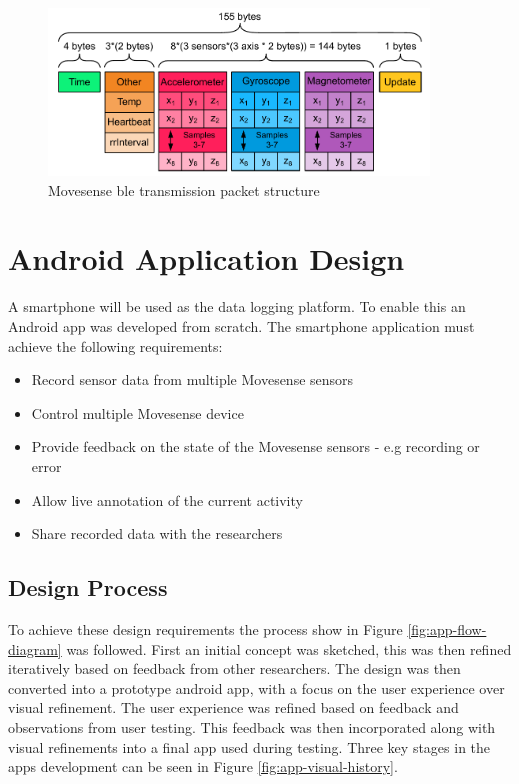 \begin{figure}[!htb]
    \centering
    \includegraphics[width=0.9\textwidth]{content/3-Methods/BLE_Bytes_Packets.pdf}
    \caption[Movesense  transmission packet structure]{Movesense \acrlong{ble} transmission packet structure}    \label{fig:methods-ble-packet-structure}
\end{figure}

\section{Android Application Design}
\label{sec:ch3-android-app}
A smartphone will be used as the data logging platform. To enable this an Android app was developed from scratch. The smartphone application must achieve the following requirements:
\begin{itemize}
    \item Record sensor data from multiple Movesense sensors
    \item Control multiple Movesense device
    \item Provide feedback on the state of the Movesense sensors - e.g recording or error
    \item Allow live annotation of the current activity
    \item Share recorded data with the researchers
\end{itemize}

\subsection{Design Process}
To achieve these design requirements the process show in Figure \ref{fig:app-flow-diagram} was followed. First an initial concept was sketched, this was then refined iteratively based on feedback from other researchers. The design was then converted into a prototype android app, with a focus on the user experience over visual refinement. The user experience was refined based on feedback and observations from user testing. This feedback was then incorporated along with visual refinements into a final app used during testing. Three key stages in the apps development can be seen in Figure \ref{fig:app-visual-history}.

